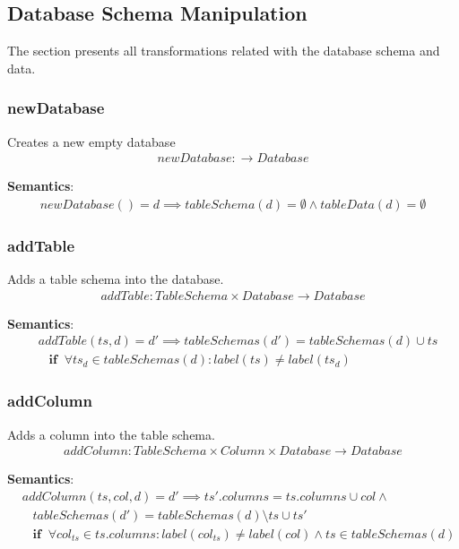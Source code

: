 \documentclass[10pt]{article}
\begin{document}
\subsection{Database Schema Manipulation}
The section presents all transformations related with the database schema and data.
\subsubsection{newDatabase}
Creates a new empty database
\begin{align}
newDatabase: \rightarrow Database 
\end{align}

\noindent \textbf{Semantics}:
\begin{align}
newDatabase() = d \implies tableSchema(d) = \emptyset \land tableData(d) = \emptyset
\end{align}

\subsubsection{addTable}
Adds a table schema into the database.
\begin{align}
addTable: TableSchema \times Database \rightarrow Database
\end{align}

\noindent \textbf{Semantics}:
\begin{align}
& addTable(ts, d) = d' \implies tableSchemas(d') = tableSchemas(d) \cup ts \nonumber \\
& \;\;\; \mathbf{if}  \;\; \forall ts_d \in tableSchemas(d) : label(ts) \neq label(ts_d)
\end{align}

\subsubsection{addColumn}
Adds a column into the table schema.
\begin{align}
addColumn: TableSchema \times Column \times Database \rightarrow Database
\end{align}

\noindent \textbf{Semantics}:
\begin{align}
& addColumn(ts, col, d) = d' \implies ts'.columns = ts.columns \cup col \land \nonumber \\
& \;\;\; tableSchemas(d') = tableSchemas(d) \setminus ts \cup ts' \nonumber \\
& \;\;\; \mathbf{if}  \;\;  \forall col_{ts} \in ts.columns : label(col_{ts}) \neq label(col) \land ts \in tableSchemas(d)
\end{align}
\end{document}
